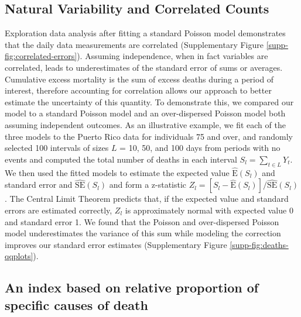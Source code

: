 \documentclass[11pt]{article}
\begin{document}
\subsection{Natural Variability and Correlated Counts}
\label{subsec:natural-variability}
Exploration data analysis after fitting a standard Poisson model demonstrates that the daily data measurements are correlated (Supplementary Figure \ref{supp-fig:correlated-errors}). Assuming independence, when in fact variables are correlated, leads to underestimates of the standard error of sums or averages. Cumulative excess mortality is the sum of excess deaths during a period of interest, therefore accounting for correlation allows our approach to better estimate the uncertainty of this quantity. To demonstrate this, we compared our model to a standard Poisson model and an over-dispersed Poisson model both assuming independent outcomes\cite{farrington1996statistical,hohle2008count,noufaily2013improved,salmon2016monitoring}. As an illustrative example, we fit each of the three models to the Puerto Rico data for individuals 75 and over, and randomly selected 100 intervals of sizes $L$ = 10, 50, and 100 days from periods with no events and computed the total number of deaths in each interval $S_l = \sum_{t \in L} Y_t$. We then used the fitted models to estimate the expected value $\hat{\mbox{E}}(S_l)$ and standard error and $\hat{\mbox{SE}}(S_l)$ and form a z-statistic $Z_l = [S_l - \hat{\mbox{E}}(S_l)]/\hat{\mbox{SE}}(S_l)$. The Central Limit Theorem predicts that, if the expected value and standard errors are estimated correctly, $Z_l$ is approximately normal with expected value 0 and standard error 1. We found that the Poisson and over-dispersed Poisson model underestimates the variance of this sum while modeling the correction improves our standard error estimates (Supplementary Figure \ref{supp-fig:deaths-qqplots}). 

\subsection{An index based on relative proportion of specific causes of death}
\label{subsec:causes-deaths}
\end{document}
